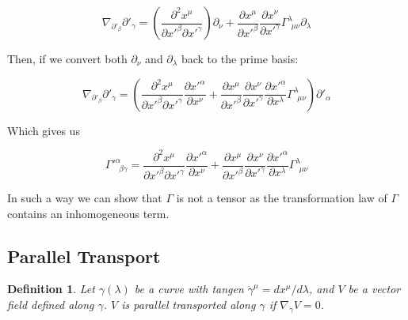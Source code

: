\documentclass{article}
\newtheorem{definition}{Definition}[section]
\begin{document}
\begin{equation}
    \nabla_{\partial'_\beta}\partial'_\gamma = \left(\frac{\partial^2 x^\mu}{\partial x'^\beta\partial x'^\gamma}\right)\partial_\nu + \frac{\partial x^\mu}{\partial x'^\beta}\frac{\partial x^\nu}{\partial x'^\gamma}\Gamma^\lambda_{~~\mu\nu}\partial_\lambda
\end{equation}

Then, if we convert both $\partial_\nu$ and $\partial_\lambda$ back to the prime basis:

\begin{equation}
   \nabla_{\partial'_\beta}\partial'_\gamma = \left(\frac{\partial^2 x^\mu}{\partial x'^\beta\partial x'^\gamma}\frac{\partial x'^\alpha}{\partial x^\nu} + \frac{\partial x^\mu}{\partial x'^\beta}\frac{\partial x^\nu}{\partial x'^\gamma}\frac{\partial x'^\alpha}{\partial x^\lambda}\Gamma^\lambda_{~~\mu\nu}\right)\partial'_\alpha
\end{equation}

Which gives us

\begin{equation}
    \boxed{\Gamma'^{\alpha}_{~~\beta\gamma} = \frac{\partial^2 x^\mu}{\partial x'^\beta\partial x'^\gamma}\frac{\partial x'^\alpha}{\partial x^\nu} + \frac{\partial x^\mu}{\partial x'^\beta}\frac{\partial x^\nu}{\partial x'^\gamma}\frac{\partial x'^\alpha}{\partial x^\lambda}\Gamma^\lambda_{~~\mu\nu}}
\end{equation}

In such a way we can show that $\Gamma$ is not a tensor as the transformation law of $\Gamma$ contains an inhomogeneous term.
\subsection{Parallel Transport}

\begin{definition}
Let $\gamma(\lambda)$ be a curve with tangen $\dot{\gamma}^\mu = dx^\mu/d\lambda$, and $V$ be a vector field defined along $\gamma$. $V$ is parallel transported along $\gamma$ if $\nabla_{\dot{\gamma}}V = 0$.
\end{definition}
\end{document}
